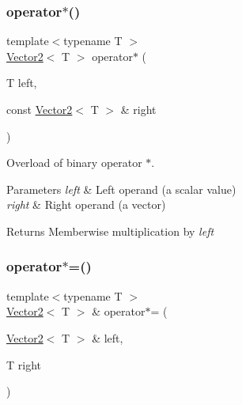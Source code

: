 \subsubsection{\texorpdfstring{operator$\ast$()}{operator*()}\hspace{0.1cm}{\footnotesize\ttfamily [2/2]}}
{\footnotesize\ttfamily template$<$typename T $>$ \\
\mbox{\hyperlink{classsf_1_1_vector2}{Vector2}}$<$ T $>$ operator$\ast$ (\begin{DoxyParamCaption}\item[{T}]{left,  }\item[{const \mbox{\hyperlink{classsf_1_1_vector2}{Vector2}}$<$ T $>$ \&}]{right }\end{DoxyParamCaption})\hspace{0.3cm}{\ttfamily [related]}}



Overload of binary operator $\ast$. 


\begin{DoxyParams}{Parameters}
{\em left} & Left operand (a scalar value) \\
\hline
{\em right} & Right operand (a vector)\\
\hline
\end{DoxyParams}
\begin{DoxyReturn}{Returns}
Memberwise multiplication by {\itshape left} \begin{DoxyVerb}\end{DoxyVerb}
 
\end{DoxyReturn}
\mbox{\label{classsf_1_1_vector2_abea24cb28c0d6e2957e259ba4e65d70e}} 
\subsubsection{\texorpdfstring{operator$\ast$=()}{operator*=()}}
{\footnotesize\ttfamily template$<$typename T $>$ \\
\mbox{\hyperlink{classsf_1_1_vector2}{Vector2}}$<$ T $>$ \& operator$\ast$= (\begin{DoxyParamCaption}\item[{\mbox{\hyperlink{classsf_1_1_vector2}{Vector2}}$<$ T $>$ \&}]{left,  }\item[{T}]{right }\end{DoxyParamCaption})\hspace{0.3cm}{\ttfamily [related]}}



